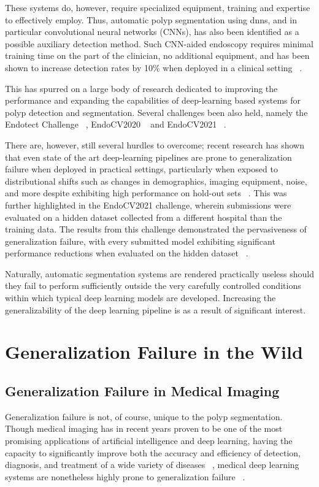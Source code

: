 	These systems do, however, require specialized equipment, training and expertise to effectively employ. Thus, automatic polyp segmentation using \glspl{dnn}, and in particular convolutional neural networks (CNNs), has also been identified as a possible auxiliary detection method. Such CNN-aided endoscopy requires minimal training time on the part of the clinician, no additional equipment, and has been shown to increase detection rates by 10\% when deployed in a clinical setting ~\cite{polyp-success-story}. 

	This has spurred on a large body of research dedicated to improving the performance and expanding the capabilities of deep-learning based systems for polyp detection and segmentation. Several challenges been also held, namely the Endotect Challenge ~\cite{endotect}, EndoCV2020 ~\cite{endocv2020} and EndoCV2021 ~\cite{endocv2021}.
	
	There are, however, still several hurdles to overcome; recent research has shown that even state of the art deep-learning pipelines are prone to generalization failure when deployed in practical settings, particularly when exposed to distributional shifts such as changes in demographics, imaging equipment, noise, and more despite exhibiting high performance on hold-out sets ~\cite{retinopathy, damour2020underspecification, pneumonia, shortcut_learning}. This was further highlighted in the EndoCV2021 challenge, wherein submissions were evaluated on a hidden dataset collected from a different hospital than the training data. The results from this challenge demonstrated the pervasiveness of generalization failure, with every submitted model exhibiting significant performance reductions when evaluated on the hidden dataset ~\cite{endocv2021}. 
	
	Naturally, automatic segmentation systems are rendered practically useless should they fail to perform sufficiently outside the very carefully controlled conditions within which typical deep learning models are developed. Increasing the generalizability of the deep learning pipeline is as a result of significant interest. 

\section{Generalization Failure in the Wild} \label{case_studies}
	\subsection{Generalization Failure in Medical Imaging}
	Generalization failure is not, of course, unique to the polyp segmentation. Though medical imaging has in recent years proven to be one of the most promising applications of artificial intelligence and deep learning, having the capacity to significantly improve both the accuracy and efficiency of detection, diagnosis, and treatment of a wide variety of diseases ~\cite{dl_medical_imaging}, medical deep learning systems are nonetheless highly prone to generalization failure ~\cite{damour2020underspecification, shortcut_learning}.
	
